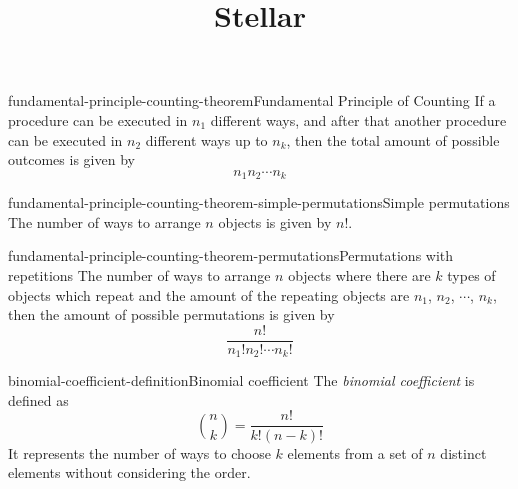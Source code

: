 \documentclass[preview]{standalone}
\begin{document}
\title{Stellar}
\genpage

\begin{snippettheorem}{fundamental-principle-counting-theorem}{Fundamental Principle of Counting}
    If a procedure can be executed in \(n_1\) different ways, and after that
    another procedure can be executed in \(n_2\) different ways
    up to \(n_k\), then the total amount of possible outcomes is given by
    \[
        n_1n_2\cdots n_k
    \]
\end{snippettheorem}

\begin{snippetcorollary}{fundamental-principle-counting-theorem-simple-permutations}{Simple permutations}
    The number of ways to arrange \(n\) objects is given by \(n!\).
\end{snippetcorollary}

\begin{snippetcorollary}{fundamental-principle-counting-theorem-permutations}{Permutations with repetitions}
    The number of ways to arrange \(n\) objects where there are
    \(k\) types of objects which repeat and the amount of the repeating objects
    are \(n_1\), \(n_2\), \(\cdots\), \(n_k\), then the amount of possible permutations is
    given by
    \[
        \frac{n!}{n_1!n_2!\cdots n_k!}
    \]
\end{snippetcorollary}



\begin{snippetdefinition}{binomial-coefficient-definition}{Binomial coefficient}
    The \textit{binomial coefficient} is defined as
    \[
        \binom{n}{k} = \frac{n!}{k!(n-k)!}
    \]
    It represents the number of ways to choose $k$ elements from a set of $n$ distinct
    elements without considering the order.
\end{snippetdefinition}

\end{document}
